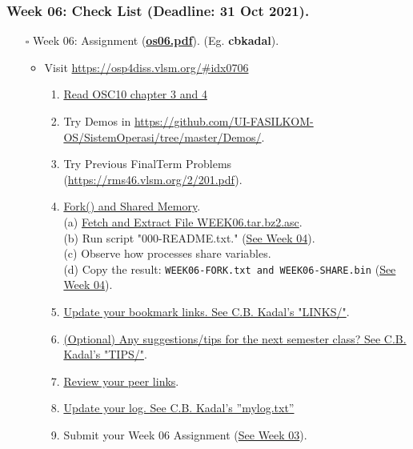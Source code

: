 \begin{frame}
\frametitle{Week 06: Check List (Deadline: 31 Oct 2021).}
\begin{itemize}
\item [$\square$] Week 06: Assignment (\href{https://os.vlsm.org/Slides/os06.pdf}{\textbf{os06.pdf}}).
(Eg. \textbf{cbkadal}).
\begin{itemize}
\item Visit \url{https://osp4diss.vlsm.org/\#idx0706}

\begin{enumerate}
\item \href{https://www.os-book.com/OS10/slide-dir/}{Read OSC10 chapter 3 and 4}
\item Try Demos in {\tiny \url{https://github.com/UI-FASILKOM-OS/SistemOperasi/tree/master/Demos/}}.
\item Try Previous FinalTerm Problems {\tiny (\url{https://rms46.vlsm.org/2/201.pdf})}.
\item \href{https://osp4diss.vlsm.org/W06-01.html}{Fork() and Shared Memory}.\\
(a) \href{https://os.vlsm.org/WEEK/WEEK06.tar.bz2.asc}{Fetch and Extract File WEEK06.tar.bz2.asc}.\\
(b) Run script "000-README.txt." (\href{https://osp4diss.vlsm.org/W04-01.html}{See Week 04}).\\
(c) Observe how processes share variables.\\
(d) Copy the result: {\tiny \texttt{WEEK06-FORK.txt and WEEK06-SHARE.bin}}
    (\href{https://osp4diss.vlsm.org/W04-03.html}{See Week 04}).\\
\item \href{https://cbkadal.github.io/os212/LINKS/}{Update your bookmark links. See C.B. Kadal's "LINKS/"}.
\item \href{https://cbkadal.github.io/os212/TIPS/}{(Optional) Any suggestions/tips for the next semester class? See C.B. Kadal's "TIPS/"}.
\item \href{https://osp4diss.vlsm.org/W02-05.html}{Review your peer links}.
\item \href{https://cbkadal.github.io/os212/TXT/mylog.txt}{Update your log. See C.B. Kadal's ''mylog.txt''}
\item Submit your Week 06 Assignment (\href{https://osp4diss.vlsm.org/W03-06.html}{See Week 03}).
\end{enumerate}
\end{itemize}
\end{itemize}

\end{frame}
